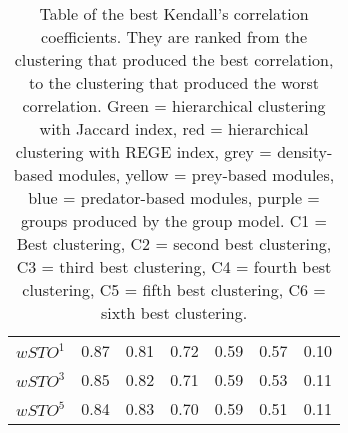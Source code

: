 \begin{table}[ht]
\begin{tabular}{lllllll}
\(\displaystyle wSTO^1 \) &   {\color[HTML]{00D768} 0.87} & {\color[HTML]{EF2A00} 0.81} & {\color[HTML]{0051D7} 0.72} & {\color[HTML]{6200D7} 0.59} & {\color{orange} 0.57} & {\color[HTML]{9B9B9B} 0.10} \\ 
\(\displaystyle wSTO^3 \) &   {\color[HTML]{00D768} 0.85} & {\color[HTML]{EF2A00} 0.82} & {\color[HTML]{0051D7} 0.71} & {\color[HTML]{6200D7} 0.59} & {\color{orange} 0.53} & {\color[HTML]{9B9B9B} 0.11} \\ 
\(\displaystyle wSTO^5 \) &   {\color[HTML]{00D768} 0.84} & {\color[HTML]{EF2A00} 0.83} & {\color[HTML]{0051D7} 0.70} & {\color[HTML]{6200D7} 0.59} & {\color{orange} 0.51} & {\color[HTML]{9B9B9B} 0.11} \\ 
\end{tabular}
\caption{Table of the best Kendall’s correlation coefficients. They are ranked from the clustering that produced the best correlation, to the clustering that produced the worst correlation.  {\color[HTML]{00D768} Green = hierarchical clustering with Jaccard index}, {\color[HTML]{EF2A00} red = hierarchical clustering with REGE index}, {\color[HTML]{9B9B9B} grey = density-based modules}, {\color{orange} yellow = prey-based modules}, {\color[HTML]{0051D7} blue = predator-based modules}, {\color[HTML]{6200D7} purple = groups produced by the group model}. C1 = Best clustering, C2 = second best clustering, C3 = third best clustering, C4 = fourth best clustering, C5 = fifth best clustering, C6 = sixth best clustering.}
\end{table}
